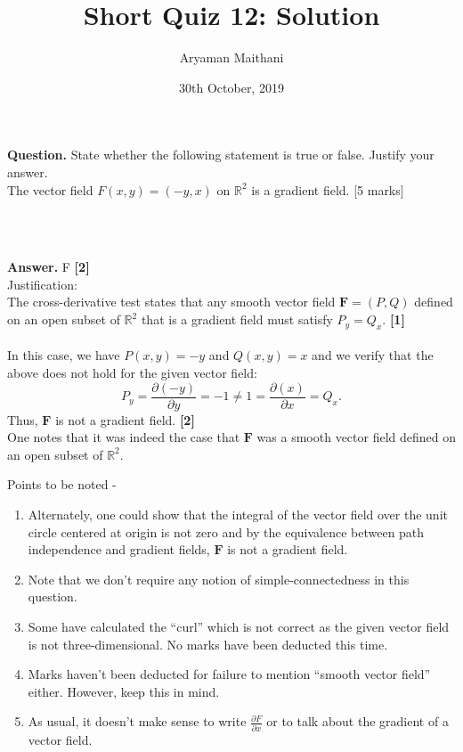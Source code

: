 \documentclass{article}
\title{Short Quiz 12: Solution}      %
\author{Aryaman Maithani}
\date{30th October, 2019}  		 %
\begin{document}
\maketitle

\hrulefill

\textbf{Question.} State whether the following statement is true or false. Justify your answer.\\ 
The vector field $F(x, y) = (-y, x)$ on $\mathbb{R}^2$ is a gradient field.
\hfill [5 marks]
\begin{flushright}
	\\~\\
\end{flushright}

\hrulefill

\textbf{Answer.} F \hfill \textbf{[2]}\\  %
Justification: \\
The cross-derivative test states that any smooth vector field $\mathbf{F} = (P, Q)$ defined on an open subset of $\mathbb{R}^2$ that is a gradient field must satisfy $P_y = Q_x.$ \hfill \textbf{[1]}\\~\\
%
In this case, we have $P(x, y) = -y$ and $Q(x, y) = x$ and we verify that the above does not hold for the given vector field:
\[P_y = \frac{\partial (-y)}{\partial y} = -1 \neq 1 = \frac{\partial (x)}{\partial x} = Q_x.\]
Thus, $\mathbf{F}$ is not a gradient field. \hfill \textbf{[2]}\\
One notes that it was indeed the case that $\mathbf{F}$ was a smooth vector field defined on an open subset of $\mathbb{R}^2.$


\hrulefill

\vspace{0.2 cm}

Points to be noted -
\begin{enumerate} 
	\item Alternately, one could show that the integral of the vector field over the unit circle centered at origin is not zero and by the equivalence between path independence and gradient fields, $\mathbf{F}$ is not a gradient field.
	\item Note that we don't require any notion of simple-connectedness in this question.
	\item Some have calculated the ``curl'' which is not correct as the given vector field is not three-dimensional. No marks have been deducted this time.
	\item Marks haven't been deducted for failure to mention ``smooth vector field'' either. However, keep this in mind.
	\item As usual, it doesn't make sense to write $\frac{\partial F}{\partial x}$ or to talk about the gradient of a vector field.
\end{enumerate}
\end{document}
